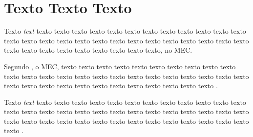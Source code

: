 \chapter{Texto Texto Texto}


 Texto \textit{text} texto texto texto texto texto texto texto texto texto texto texto texto texto texto texto texto texto texto texto texto texto texto texto texto texto texto texto texto texto texto texto texto texto texto texto, no \gls{MEC}.

 Segundo , o \gls{MEC}, texto texto texto texto texto texto texto texto texto texto texto texto texto texto texto texto texto texto texto texto texto texto texto texto texto texto texto texto texto texto texto texto texto texto texto texto .
 
 \begin{citacao}
 Texto \textit{text} texto texto texto texto texto texto texto texto texto texto texto texto texto texto texto texto texto texto texto texto texto texto texto texto texto texto texto texto texto texto texto texto texto texto texto texto texto texto texto texto texto \cite{manualufpe2020}.  
 \end{citacao}


 
 
